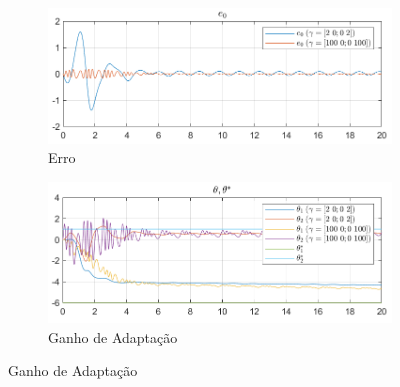 \documentclass[10pt]{article}
\begin{document}
\begin{figure}[h!]
    \centering
    \begin{subfigure}[b]{0.45\textwidth}
        \centering
        \includegraphics[width=\textwidth]{img/fig06a.png}
        \caption{Erro}
    \end{subfigure}
    \begin{subfigure}[b]{0.45\textwidth}
        \centering
        \includegraphics[width=\textwidth]{img/fig06b.png}
        \caption{Ganho de Adaptação}
    \end{subfigure}

    \vspace{0.5cm}


\end{figure}
\end{document}
